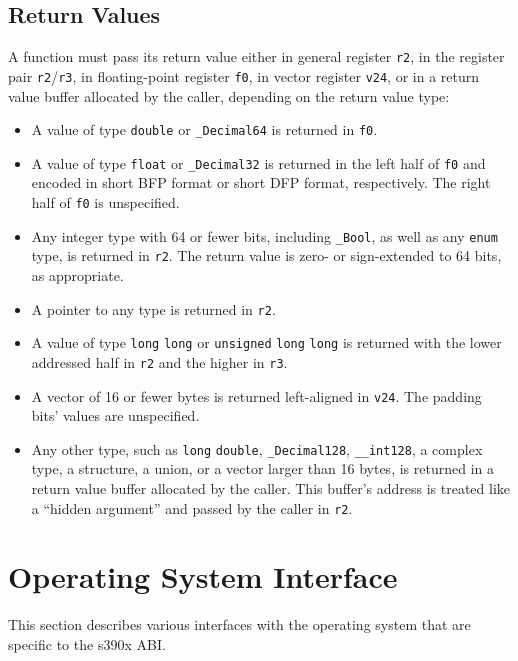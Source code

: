 \documentclass[english,11pt,twoside,toc=bib,toc=idx]{scrreprt}
\newcommand{\NBITS}{64}
\newcommand{\ABINAME}{s390x}
\newcommand{\NBITS}{32}
\newcommand{\ABINAME}{s390}
\begin{document}
\subsection{Return Values}
\label{retvalues}
A function must pass its return value either in general register
\texttt{r2},{\ifzseries\else{} in the register pair
  \texttt{r2}/\texttt{r3},\fi} in floating-point register \texttt{f0}, in
vector register \texttt{v24}, or in a return value buffer allocated by the
caller, depending on the return value type:

\begin{itemize}
\item A value of type \texttt{double} or \texttt{\_Decimal64} is returned
  in \texttt{f0}.
\item A value of type \texttt{float} or \texttt{\_Decimal32} is returned
  in the left half of \texttt{f0} and encoded in short BFP format or short
  DFP format, respectively.  The right half of \texttt{f0} is unspecified.
\item Any integer type with \NBITS{} or fewer bits, including
  \texttt{\_Bool}, as well as any \texttt{enum} type, is returned in
  \texttt{r2}.  The return value is zero- or sign-extended to \NBITS{}
  bits, as appropriate.
\item A pointer to any type is returned in \texttt{r2}.
  \ifzseries\else
\item A value of type \texttt{long} \texttt{long} or \texttt{unsigned}
  \texttt{long} \texttt{long} is returned with the lower addressed half in
  \texttt{r2} and the higher in \texttt{r3}.\fi
\item A vector of 16 or fewer bytes is returned left-aligned in
  \texttt{v24}.  The padding bits' values are unspecified.
\item Any other type, such as \texttt{long} \texttt{double},
  \texttt{\_Decimal128}, \texttt{\_\_int128}, a complex type, a structure,
  a union, or a vector larger than 16 bytes, is returned in a return value
  buffer allocated by the caller.  This buffer's address is treated like a
  ``hidden argument'' and passed by the caller in \texttt{r2}.
\end{itemize}

\section{Operating System Interface}
This section describes various interfaces with the operating system that
are specific to the \ABINAME{} ABI\@.
\end{document}
